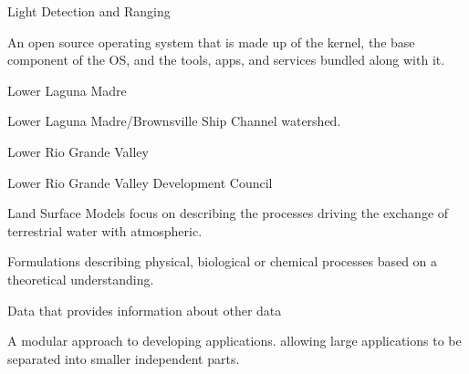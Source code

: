 \documentclass[letterpaper,12pt,english,openany,oneside]{sphinxmanual}
\begin{document}
\begin{description}
\sphinxAtStartPar
Light Detection and Ranging

\sphinxAtStartPar
An open source operating system that is made up of the kernel, the base component of the OS, and the tools, apps, and services bundled along with it.

\sphinxAtStartPar
Lower Laguna Madre

\sphinxAtStartPar
Lower Laguna Madre/Brownsville Ship Channel watershed.

\sphinxAtStartPar
Lower Rio Grande Valley

\sphinxAtStartPar
Lower Rio Grande Valley Development Council

\sphinxAtStartPar
Land Surface Models focus on describing the processes driving the exchange of terrestrial water with atmospheric.

\sphinxAtStartPar
Formulations describing physical, biological or chemical processes based on a theoretical understanding.

\sphinxAtStartPar
Data that provides information about other data

\sphinxAtStartPar
A modular approach to developing applications. allowing large applications to be separated into smaller independent parts.


\end{description}
\end{document}

